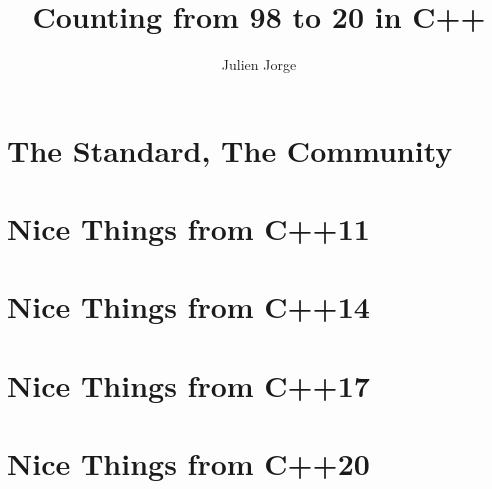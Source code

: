 \documentclass{book}
\title{Counting from 98 to 20 in C++}
\author{Julien Jorge}
\begin{document}
\maketitle

\tableofcontents

\chapter{The Standard, The Community}
\chapter{Nice Things from C++11}
\chapter{Nice Things from C++14}
\chapter{Nice Things from C++17}
\chapter{Nice Things from C++20}
\end{document}
